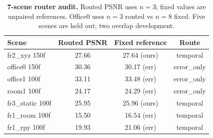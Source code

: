 \documentclass[10pt,twocolumn,letterpaper]{article}
\begin{document}
\begin{table}[tbp]
\centering
\footnotesize\setlength{\tabcolsep}{3pt}
\begin{tabular}{lccc}
\toprule
\textbf{Scene} & \textbf{Routed PSNR} & \textbf{Fixed reference} & \textbf{Route} \\
\midrule
fr2\_xyz 150f & 27.66 & 27.64 (ours) & temporal \\
office0 150f & 30.36 & 30.17 (err) & error\_only \\
office1 100f & 33.11 & 33.48 (err) & error\_only \\
room1 100f & 24.17 & 24.29 (err) & error\_only \\
fr3\_static 100f & 25.95 & 25.96 (ours) & temporal \\
fr1\_room 100f & 15.50 & 16.54 (err) & temporal \\
fr1\_rpy 100f & 19.93 & 21.06 (err) & temporal \\
\bottomrule
\end{tabular}
\caption{\textbf{7-scene router audit.} Routed PSNR uses $n=3$; fixed values are unpaired references. Office0 uses $n=3$ routed vs $n=8$ fixed. Five scenes are held out; two overlap development.}
\label{tab:routing7}
\end{table}
\end{document}
